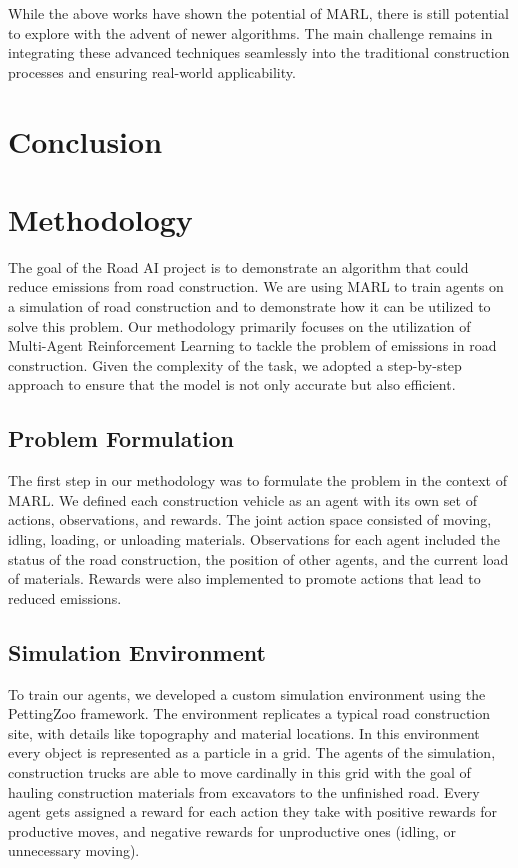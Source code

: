 \documentclass[conference]{IEEEtran}
\begin{document}
	While the above works have shown the potential of MARL, there is still potential to explore with the advent of newer algorithms. The main challenge remains in integrating these advanced techniques seamlessly into the traditional construction processes and ensuring real-world applicability.

	\noindent


	\section{Conclusion}




\section{Methodology}

The goal of the Road AI project is to demonstrate an algorithm that could reduce emissions from road construction.
We are using MARL to train agents on a simulation of road construction and to demonstrate how it can be utilized to solve this problem.
Our methodology primarily focuses on the utilization of Multi-Agent Reinforcement Learning to tackle the problem of emissions in road construction. Given the complexity of the task, we adopted a step-by-step approach to ensure that the model is not only accurate but also efficient.

\subsection{Problem Formulation}
The first step in our methodology was to formulate the problem in the context of MARL. We defined each construction vehicle as an agent with its own set of actions, observations, and rewards. The joint action space consisted of moving, idling, loading, or unloading materials. Observations for each agent included the status of the road construction, the position of other agents, and the current load of materials. Rewards were also implemented to promote actions that lead to reduced emissions.

\subsection{Simulation Environment}
To train our agents, we developed a custom simulation environment using the PettingZoo framework. The environment replicates a typical road construction site, with details like topography and material locations. In this environment every object is represented as a particle in a grid.
The agents of the simulation, construction trucks are able to move cardinally in this grid with the goal of hauling construction materials from excavators to the unfinished road.
Every agent gets assigned a reward for each action they take with positive rewards for productive moves, and negative rewards for unproductive ones (idling, or unnecessary moving).
\end{document}
